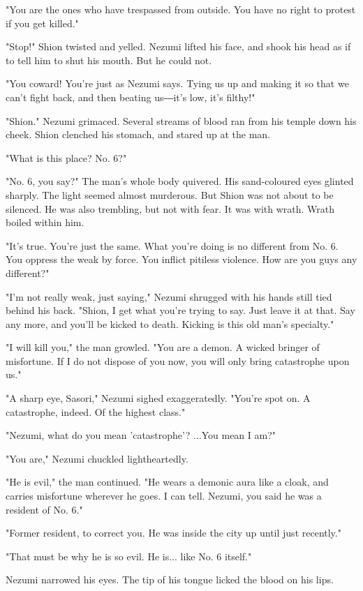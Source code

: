 "You are the ones who have trespassed from outside. You have no right to
protest if you get killed."

"Stop!" Shion twisted and yelled. Nezumi lifted his face, and shook his
head as if to tell him to shut his mouth. But he could not.

"You coward! You're just as Nezumi says. Tying us up and making it so
that we can't fight back, and then beating us―it's low, it's filthy!"

"Shion." Nezumi grimaced. Several streams of blood ran from his temple
down his cheek. Shion clenched his stomach, and stared up at the man.

"What is this place? No. 6?"

"No. 6, you say?" The man's whole body quivered. His sand-coloured eyes
glinted sharply. The light seemed almost murderous. But Shion was not
about to be silenced. He was also trembling, but not with fear. It was
with wrath. Wrath boiled within him.

"It's true. You're just the same. What you're doing is no different from
No. 6. You oppress the weak by force. You inflict pitiless violence. How
are you guys any different?"

"I'm not really weak, just saying," Nezumi shrugged with his hands still
tied behind his back. "Shion, I get what you're trying to say. Just
leave it at that. Say any more, and you'll be kicked to death. Kicking
is this old man's specialty."

"I will kill you," the man growled. "You are a demon. A wicked bringer
of misfortune. If I do not dispose of you now, you will only bring
catastrophe upon us."

"A sharp eye, Sasori," Nezumi sighed exaggeratedly. "You're spot on. A
catastrophe, indeed. Of the highest class."

"Nezumi, what do you mean 'catastrophe'? ...You mean I am?"

"You are," Nezumi chuckled lightheartedly.

"He is evil," the man continued. "He wears a demonic aura like a cloak,
and carries misfortune wherever he goes. I can tell. Nezumi, you said he
was a resident of No. 6."

"Former resident, to correct you. He was inside the city up until just
recently."

"That must be why he is so evil. He is... like No. 6 itself."

Nezumi narrowed his eyes. The tip of his tongue licked the blood on his
lips.


